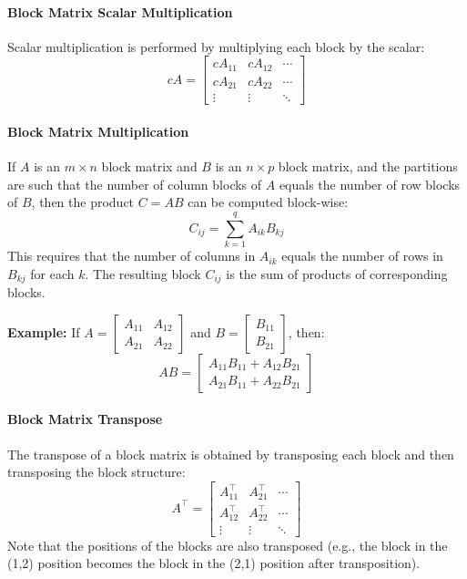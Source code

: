 \documentclass[oneside]{book}
\begin{document}
\paragraph*{Block Matrix Scalar Multiplication}
Scalar multiplication is performed by multiplying each block by the scalar:
\[
cA = \begin{bmatrix}
    cA_{11} & cA_{12} & \cdots \\
    cA_{21} & cA_{22} & \cdots \\
    \vdots & \vdots & \ddots
\end{bmatrix}
\]

\paragraph*{Block Matrix Multiplication}
If \( A \) is an \( m \times n \) block matrix and \( B \) is an \( n \times p \) block matrix, and the partitions are such that the number of column blocks of \( A \) equals the number of row blocks of \( B \), then the product \( C = AB \) can be computed block-wise:
\[
C_{ij} = \sum_{k=1}^{q} A_{ik} B_{kj}
\]
This requires that the number of columns in \( A_{ik} \) equals the number of rows in \( B_{kj} \) for each \( k \). The resulting block \( C_{ij} \) is the sum of products of corresponding blocks.

\textbf{Example:} If \( A = \begin{bmatrix} A_{11} & A_{12} \\ A_{21} & A_{22} \end{bmatrix} \) and \( B = \begin{bmatrix} B_{11} \\ B_{21} \end{bmatrix} \), then:
\[
AB = \begin{bmatrix}
    A_{11}B_{11} + A_{12}B_{21} \\
    A_{21}B_{11} + A_{22}B_{21}
\end{bmatrix}
\]

\paragraph*{Block Matrix Transpose}
The transpose of a block matrix is obtained by transposing each block and then transposing the block structure:
\[
A^\top = \begin{bmatrix}
    A_{11}^\top & A_{21}^\top & \cdots \\
    A_{12}^\top & A_{22}^\top & \cdots \\
    \vdots & \vdots & \ddots
\end{bmatrix}
\]
Note that the positions of the blocks are also transposed (e.g., the block in the (1,2) position becomes the block in the (2,1) position after transposition).
\end{document}
